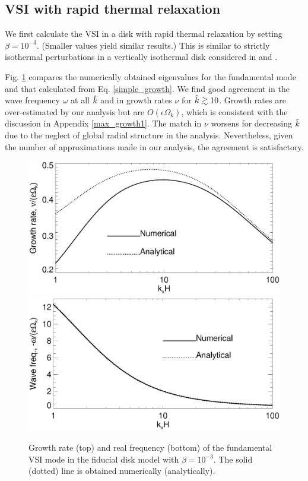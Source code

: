\subsection{VSI with rapid thermal relaxation}\label{vertiso_pertiso} 
We first calculate the VSI in a disk with rapid thermal relaxation by
setting $\beta=10^{-3}$. (Smaller values yield similar results.) This
is similar to strictly isothermal perturbations in a vertically
isothermal disk considered in \cite{nelson13} and \cite{mcnally14}. 

Fig. \ref{iso_eigen_kx} compares the numerically obtained eigenvalues 
for the fundamental mode and that calculated from 
Eq. \ref{simple_growth}. We find good agreement in the
wave frequency $\omega$ at all $\hat{k}$ and in growth rates $\nu$ for
$\hat{k}\gtrsim 10$. Growth rates are over-estimated by our analysis but 
are $O(\epsilon\Omega_k)$, which is consistent with the discussion in
Appendix \ref{max_growth1}. The match in $\nu$ worsens for
decreasing $\hat{k}$ due to the neglect of global radial structure in
the analysis. Nevertheless, given the number of approximations made
in our analysis, the agreement is satisfactory. 

\begin{figure}
  \includegraphics[width=\linewidth,clip=true,trim=0cm 1.75cm 0cm
  0cm]{figures/compare_eigen_imag_iso} 
  \includegraphics[width=\linewidth,clip=true,trim=0cm 0cm 0cm
  1cm]{figures/compare_eigen_real_iso}
  \caption{Growth rate (top) and real frequency (bottom) of the
    fundamental VSI mode in the fiducial disk model with $\beta =
    10^{-3}$. 
    The solid (dotted) line is obtained numerically
    (analytically).  
    \label{iso_eigen_kx} 
  }
\end{figure}

